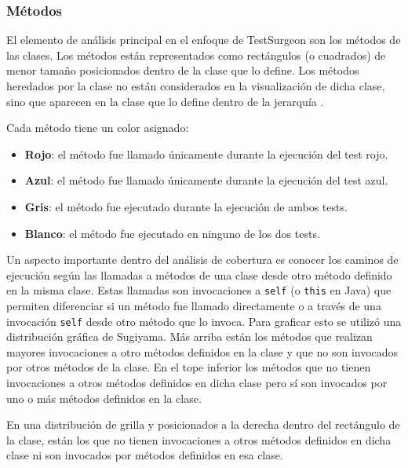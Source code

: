 
\subsubsection{Métodos}

\par El elemento de análisis principal en el enfoque de TestSurgeon son los métodos de las clases. Los métodos están representados como rectángulos (o cuadrados) de menor tamaño posicionados dentro de la clase que lo define.  Los métodos heredados por la clase no están considerados en la visualización de dicha clase, sino que aparecen en la clase que lo define dentro de la jerarquía
.  

\par Cada método tiene un color asignado:
\begin{itemize}
\item {\bf Rojo}: el método fue llamado únicamente durante la ejecución del test rojo.
\item {\bf Azul}: el método fue llamado únicamente durante la ejecución del test azul.
\item {\bf Gris}: el método fue ejecutado durante la ejecución de ambos tests.
\item {\bf Blanco}: el método fue ejecutado en ninguno de los dos tests.
\end{itemize}

\par Un aspecto importante dentro del análisis de cobertura es conocer los caminos de ejecución según las llamadas a métodos de una clase desde otro método definido en la misma clase. Estas llamadas son invocaciones a {\tt self} (o {\tt this} en Java) que permiten diferenciar si un método fue llamado directamente o a través de una invocación {\tt self} desde otro método que lo invoca. Para graficar esto se utilizó una distribución gráfica de Sugiyama. Más arriba están los métodos que realizan mayores invocaciones a otro métodos definidos en la clase y que no son invocados por otros métodos de la clase. En el tope inferior los métodos que no tienen invocaciones a otros métodos definidos en dicha clase pero sí son invocados por uno o más métodos definidos en la clase.

\par En una distribución de grilla y posicionados a la derecha dentro del rectángulo de la clase, están los que no tienen invocaciones a otros métodos definidos en dicha clase ni son invocados por métodos definidos en esa clase.

